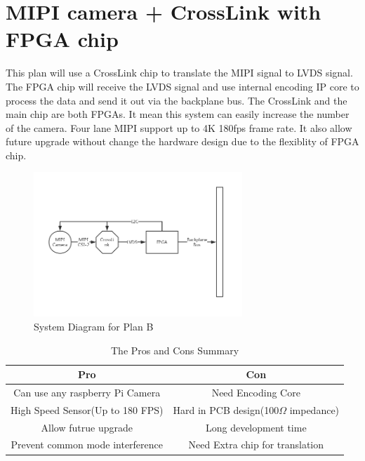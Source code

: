 \documentclass[12pt,article]{memoir}
\begin{document}
\section{MIPI camera + CrossLink with FPGA chip}
This plan will use a CrossLink chip to translate the MIPI signal to LVDS signal. The FPGA chip will receive the LVDS signal and use internal encoding IP core to process the data and send it out via the backplane bus. The CrossLink and the main chip are both FPGAs. It mean this system can easily increase the number of the camera. Four lane MIPI support up to 4K 180fps frame rate. It also allow future upgrade without change the hardware design due to the flexiblity of FPGA chip.
\begin{figure}[htp]
\begin{center}
\includegraphics[width=0.7\textwidth]{img/DR00002_Plan2.png}
 \caption{System Diagram for Plan B}	
\end{center}
\end{figure}
\begin{table}[H]
	\centering
		\begin{tabu}{c | c }
		Pro & Con \\ \hline
		Can use any raspberry Pi Camera & Need Encoding Core \\
		High Speed Sensor(Up to 180 FPS) & Hard in PCB design(100$\Omega$ impedance) \\
		Allow futrue upgrade & Long development time \\
		Prevent common mode interference  & Need Extra chip for translation \\
		\end{tabu}
	\caption{The Pros and Cons Summary}
\end{table}
\newpage
\end{document}
